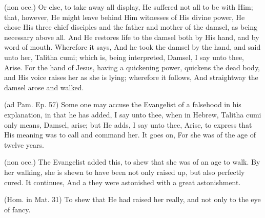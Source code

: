  (non occ.) Or else, to take away all display, He suffered not all to be with Him; that, however, He might leave behind Him witnesses of His divine power, He chose His three chief disciples and the father and mother of the damsel, as being necessary above all. And He restores life to the damsel both by His hand, and by word of mouth. Wherefore it says, And he took the damsel by the hand, and said unto her, Talitha cumi; which is, being interpreted, Damsel, I say unto thee, Arise. For the hand of Jesus, having a quickening power, quickens the dead body, and His voice raises her as she is lying; wherefore it follows, And straightway the damsel arose and walked.

 (ad Pam. Ep. 57) Some one may accuse the Evangelist of a falsehood in his explanation, in that he has added, I say unto thee, when in Hebrew, Talitha cumi only means, Damsel, arise; but He adds, I say unto thee, Arise, to express that His meaning was to call and command her. It goes on, For she was of the age of twelve years.

 (non occ.) The Evangelist added this, to shew that she was of an age to walk. By her walking, she is shewn to have been not only raised up, but also perfectly cured. It continues, And a they were astonished with a great astonishment.

 (Hom. in Mat. 31) To shew that He had raised her really, and not only to the eye of fancy.


